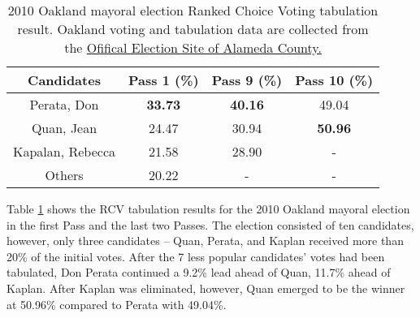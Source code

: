\documentclass[12pt, a4paper, twoside]{article}
\begin{document}
\begin{table}[h]
\centering
\begin{tabular}{|c|c|c|c|}
\hline
Candidates & Pass 1 (\%) & Pass 9 (\%) & Pass 10 (\%) \\ \hline
Perata, Don & \textbf{33.73} & \textbf{40.16} & 49.04 \\ \hline
Quan, Jean & 24.47 & 30.94 & \textbf{50.96} \\ \hline
Kapalan, Rebecca & 21.58 & 28.90 & - \\ \hline
Others & 20.22 & - & - \\ \hline
\end{tabular}
\caption{2010 Oakland mayoral election Ranked Choice Voting tabulation result. Oakland voting and tabulation data are collected from the \href{https://acvote.alamedacountyca.gov/acvote-assets/pdf/elections/2010/11022010/results/rcv/oakland/mayor/november-2-2010-pass-report-oakland-mayor.pdf}{Ofifical Election Site of Alameda County.}}
\label{tab:8}
\end{table}

Table \ref{tab:8} shows the RCV tabulation results for the 2010 Oakland mayoral election in the first Pass and the last two Passes. The election consisted of ten candidates, however, only three candidates – Quan, Perata, and Kaplan received more than 20\% of the initial votes. After the 7 less popular candidates’ votes had been tabulated, Don Perata continued a 9.2\% lead ahead of Quan, 11.7\% ahead of Kaplan. After Kaplan was eliminated, however, Quan emerged to be the winner at 50.96\% compared to Perata with 49.04\%. 

\begin{figure}[ht]
  \centering
  \label{fig:1}
\end{figure}
\end{document}
